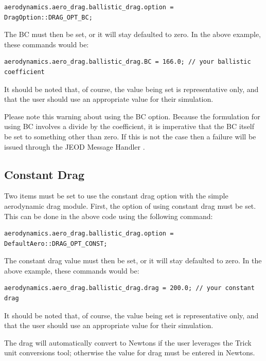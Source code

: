 \begin{verbatim}
aerodynamics.aero_drag.ballistic_drag.option = DragOption::DRAG_OPT_BC;
\end{verbatim}

The BC must then be set, or it will
stay defaulted to zero. In the above example, these commands would be:

\begin{verbatim}
aerodynamics.aero_drag.ballistic_drag.BC = 166.0; // your ballistic coefficient
\end{verbatim}

It should be noted that, of course, the value being set is representative
only, and that the user should use an appropriate value for their simulation.

Please note this warning about using the BC option. Because the formulation for
using BC involves a divide by the coefficient, it is imperative that the
BC itself be set to something other than zero. If this is not the case then
a failure will be issued through the JEOD Message Handler \cite{dynenv:MESSAGE}.

\subsection{Constant Drag}

Two items must be set to use the constant drag option with the
simple aerodynamic drag module. First, the option of using constant drag must
be set. This can be done in the above code using the following command:

\begin{verbatim}
aerodynamics.aero_drag.ballistic_drag.option = DefaultAero::DRAG_OPT_CONST;
\end{verbatim}

The constant drag value must then be set, or it will
stay defaulted to zero. In the above example, these commands would be:

\begin{verbatim}
aerodynamics.aero_drag.ballistic_drag.drag = 200.0; // your constant drag
\end{verbatim}

It should be noted that, of course, the value being set is representative
only, and that the user should use an appropriate value for their simulation.

The drag will automatically convert to Newtons if the user
leverages the Trick unit conversions tool; otherwise the value for drag
must be entered in Newtons.

